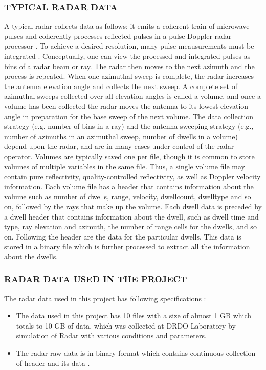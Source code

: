 \documentclass[14pt]{article} %
\begin{document}
\subsubsection{TYPICAL RADAR DATA}
A typical radar collects data as follows: it emits a coherent train of microwave pulses and coherently processes reflected pulses in a pulse-Doppler radar processor . To achieve a desired resolution, many pulse meausurements must be integrated . Conceptually, one can view the processed and integrated pulses as bins of a radar beam or ray. The radar then moves to the next azimuth and the process is repeated. When one azimuthal sweep is complete, the radar increases the antenna elevation angle and collects the next sweep. A complete set of azimuthal sweeps collected over all elevation angles is called a volume, and once a volume has been collected the radar moves the antenna to its lowest elevation angle in preparation for the base sweep of the next volume. The data collection strategy (e.g. number of bins in a ray) and the antenna sweeping strategy (e.g., number of azimuths in an azimuthal sweep, number of dwells in a volume) depend upon the radar, and are in many cases under control of the radar operator.  Volumes are typically saved one per file, though it is common to store volumes of multiple variables in the same file. Thus, a single volume file may contain pure reflectivity, quality-controlled reflectivity, as well as Doppler velocity information. Each volume file has a header that contains information about the volume such as  number of dwells, range, velocity, dwellcount, dwelltype and so on, followed by the rays that make up the volume. Each dwell data is preceded by a dwell header that contains information about the dwell, such as dwell time and type, ray elevation and azimuth, the number of range cells for the dwells, and so on. Following the header are the data for the particular dwells. This data is stored in a binary file which is further processed to extract all the information about the dwells.

\subsubsection{RADAR DATA USED IN THE PROJECT }
The radar data used in this project has following specifications :
\begin{itemize}

\item The data used in this project has 10 files with a size of almost 1 GB which totals to 10 GB of data, which was collected at DRDO Laboratory by simulation of Radar with various conditions and parameters.
 \item The radar raw data is in binary format which contains continuous collection of  header and its data .
 \end{itemize}
\end{document}
